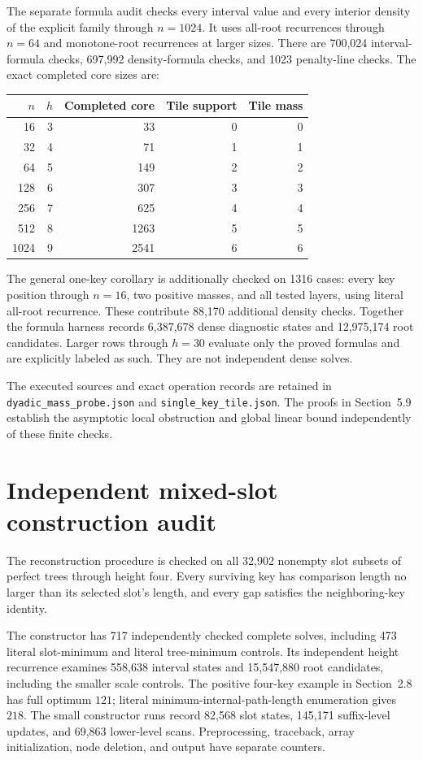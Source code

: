 \documentclass[11pt]{article}
\begin{document}
The separate formula audit checks every interval value and every interior
density of the explicit family through $n=1024$. It uses all-root
recurrences through $n=64$ and monotone-root recurrences at larger sizes.
There are 700,024 interval-formula checks, 697,992 density-formula checks,
and 1023 penalty-line checks. The exact completed core sizes are:
\begin{center}
\begin{tabular}{rrrrr}
\toprule
$n$ & $h$ & Completed core & Tile support & Tile mass\\
\midrule
16 & 3 & 33 & 0 & 0\\
32 & 4 & 71 & 1 & 1\\
64 & 5 & 149 & 2 & 2\\
128 & 6 & 307 & 3 & 3\\
256 & 7 & 625 & 4 & 4\\
512 & 8 & 1263 & 5 & 5\\
1024 & 9 & 2541 & 6 & 6\\
\bottomrule
\end{tabular}
\end{center}
The general one-key corollary is additionally checked on 1316 cases:
every key position through $n=16$, two positive masses, and all tested
layers, using literal all-root recurrence. These contribute 88,170
additional density checks. Together the formula harness records
6,387,678 dense diagnostic states and 12,975,174 root candidates.
Larger rows through $h=30$ evaluate only the proved formulas and are
explicitly labeled as such. They are not independent dense solves.

The executed sources and exact operation records are retained in
\texttt{dyadic\_mass\_probe.json} and \texttt{single\_key\_tile.json}.
The proofs in Section~5.9 establish the
asymptotic local obstruction and global linear bound independently of
these finite checks.

\section{Independent mixed-slot construction audit}
\label{app:mixed-slots}
The reconstruction procedure is checked on all 32,902 nonempty slot subsets
of perfect trees through height four. Every surviving key has comparison
length no larger than its selected slot's length, and every gap satisfies
the neighboring-key identity.

The constructor has 717 independently checked complete solves, including
473 literal slot-minimum and literal tree-minimum controls. Its independent
height recurrence examines 558,638 interval states and 15,547,880 root
candidates, including the smaller scale controls. The positive four-key
example in Section~2.8 has full optimum $121$; literal
minimum-internal-path-length enumeration gives $218$.
The small constructor runs record 82,568 slot states, 145,171 suffix-level
updates, and 69,863 lower-level scans. Preprocessing, traceback, array
initialization, node deletion, and output have separate counters.
\end{document}
